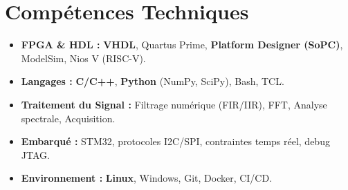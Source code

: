 \documentclass[a4paper,11pt]{article}
\begin{document}
\section{Compétences Techniques}
\begin{itemize}[leftmargin=*, nosep]
    \item \small{\textbf{FPGA \& HDL :} \textbf{VHDL}, Quartus Prime, \textbf{Platform Designer (SoPC)}, ModelSim, Nios V (RISC-V).}
    \item \small{\textbf{Langages :} \textbf{C/C++}, \textbf{Python} (NumPy, SciPy), Bash, TCL.}
    \item \small{\textbf{Traitement du Signal :} Filtrage numérique (FIR/IIR), FFT, Analyse spectrale, Acquisition.}
    \item \small{\textbf{Embarqué :} STM32, protocoles I2C/SPI, contraintes temps réel, debug JTAG.}
    \item \small{\textbf{Environnement :} \textbf{Linux}, Windows, Git, Docker, CI/CD.}
\end{itemize}

\end{document}
